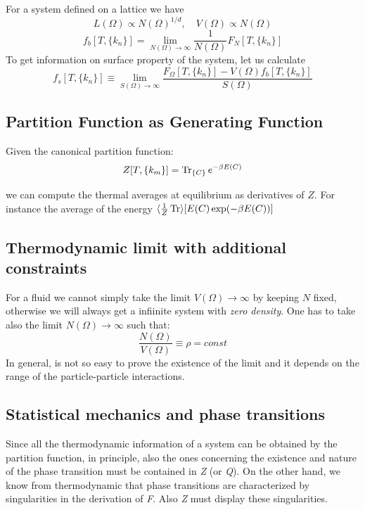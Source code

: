 \documentclass[../../Main/Main.tex]{subfiles}
\begin{document}
For a system defined on a lattice we have
\begin{equation*}
  L (\Omega ) \propto N (\Omega )^{1/d}, \quad V (\Omega ) \propto N (\Omega )
\end{equation*}
\begin{equation*}
  f_b [T,\{ k_n \}  ] = \lim_{N (\Omega) \rightarrow \infty } \frac{1}{N (\Omega )} F_N [T,\{ k_n \}  ]
\end{equation*}
To get information on surface property of the system, let us calculate
\begin{equation}
  f_s [T,\{ k_n \}  ] \equiv \lim_{S (\Omega ) \rightarrow \infty } \frac{F_ \Omega [T,\{ k_n \}  ]  - V (\Omega ) f_b [T,\{ k_n \}  ]}{S (\Omega )}
\end{equation}

\subsection{Partition Function as Generating Function}

Given the canonical partition function:
\begin{equation}
  Z[T, \{ k_{m} \}] = \Trace_{ \{ C \}} e^{-\beta E(C)}
\end{equation}

we can compute the thermal averages at equilibrium as derivatives of $Z$. For instance the average of the energy \( \langle \frac{1}{Z}\Tr \rangle [E(C) \exp(-\beta E(C))] \)




\subsection{Thermodynamic limit with additional constraints}
For a fluid we cannot simply take the limit \( V (\Omega ) \rightarrow \infty  \) by keeping \( N \) fixed, otherwise we will always get a infiinite system with \emph{zero density}. One has to take also the limit \( N(\Omega ) \rightarrow \infty  \) such that:
\begin{equation*}
  \frac{N (\Omega )}{V (\Omega )} \equiv \rho = const
\end{equation*}
In general, is not so easy to prove the existence of the limit and it depends on the range of the particle-particle interactions.

\subsection{Statistical mechanics and phase transitions}
Since all the thermodynamic information of a system can be obtained by the partition function, in principle, also the ones concerning the existence and nature of the phase transition must be contained in \emph{Z} (or \emph{Q}). On the other hand, we know from thermodynamic that phase transitions are characterized by singularities in the derivation of \emph{F}. Also \emph{Z} must display these singularities.
\end{document}
